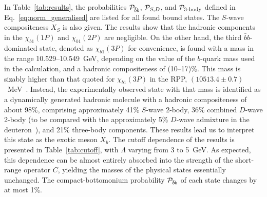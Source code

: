 \documentclass[aps,prd,showpacs,amsmath,twocolumn,superscriptaddress,floatfix,nofootinbib,notitlepage]{revtex4-2}
\newcommand{\Xb}{X_b}
\begin{document}
In Table~\ref{tab:results}, the probabilities ${\cal P}_{\bar{b}b}$, ${\cal P}_{S,D}$, and ${\cal P}_{\text{3-body}}$ defined in Eq.~\eqref{eq:norm_generalised} are listed for all found bound states. 
The $S$-wave compositeness $X_S$ is also given.
The results show that the hadronic components in the $\chi_{b1}(1P)$ and $\chi_{b1}(2P)$ are negligible. On the other hand, the third $\bar{b}b$-dominated state, denoted as $\chi_{b1}(3P)$ for convenience, is found with a mass in the range
10.529--10.549~GeV, depending on the value of the $b$-quark mass used in the calculation, and a hadronic compositeness of (10--17)\%. This mass is sizably higher than that quoted for $\chi_{b1}(3P)$ in the RPP, $(10513.4 \pm 0.7)$~MeV~\cite{ParticleDataGroup:2026mpi}.
Instead, the experimentally observed state with that mass is identified as a dynamically generated hadronic molecule with a hadronic compositeness of about 98\%, comprising approximately 41\% $S$-wave 2-body, 36\% combined $D$-wave 2-body (to be compared with the approximately 5\% $D$-wave admixture in the deuteron~\cite{Machleidt:1987hj,Epelbaum:2019kcf}), and 21\% three-body components. These results lead us to interpret this state as the exotic meson $\Xb$.
The cutoff dependence of the results is presented in Table~\ref{tab:cutoff}, with $\Lambda$ varying from 3 to 5~GeV. As expected, this dependence can be almost entirely absorbed into the strength of the short-range operator $C$, yielding the masses of the physical states essentially unchanged. 
The compact-bottomonium probability ${\cal P}_{\bar{b}b}$ of each state changes by at most 1\%.
\end{document}
